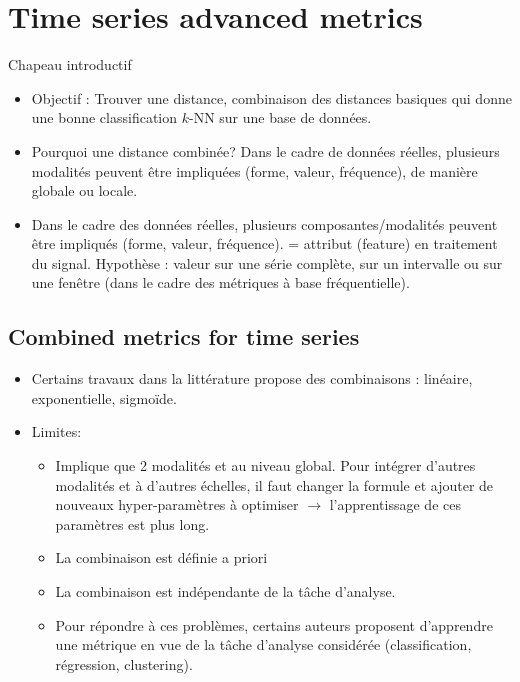 \chapter{Time series advanced metrics}
\label{sec:unchapitre}
\minitoc

\noindent Chapeau introductif
\begin{itemize}
	\item Objectif : Trouver une distance, combinaison des distances basiques qui donne une bonne classification $k$-NN sur une base de données.
	\item Pourquoi une distance combinée? Dans le cadre de données réelles, plusieurs modalités peuvent être impliquées (forme, valeur, fréquence), de manière globale ou locale.
	\item Dans le cadre des données réelles, plusieurs composantes/modalités peuvent être impliqués (forme, valeur, fréquence). = attribut (feature) en traitement du signal. Hypothèse : valeur sur une série complète, sur un intervalle ou sur une fenêtre (dans le cadre des métriques à base fréquentielle).
\end{itemize}

\section{Combined metrics for time series}
\begin{itemize}
	\item Certains travaux dans la littérature propose des combinaisons : linéaire, exponentielle, sigmoïde.
	\item Limites:
	\begin{itemize}
		\item Implique que 2 modalités et au niveau global. Pour intégrer d'autres modalités et à d'autres échelles, il faut changer la formule et ajouter de nouveaux hyper-paramètres à optimiser $\rightarrow$ l'apprentissage de ces paramètres est plus long.
		\item La combinaison est définie a priori
		\item La combinaison est indépendante de la tâche d'analyse.
		\item Pour répondre à ces problèmes, certains auteurs proposent d'apprendre une métrique en vue de la tâche d'analyse considérée (classification, régression, clustering).
	\end{itemize}
\end{itemize}


